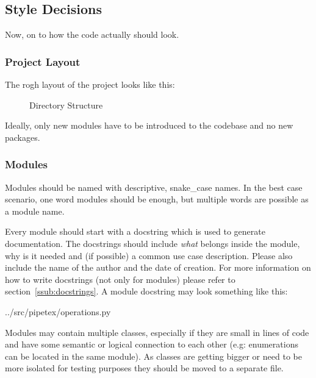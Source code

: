 \subsection{Style Decisions}\label{sub:descitions}
Now, on to how the code actually should look.

\subsubsection{Project Layout}
The rogh layout of the project looks like this: 

\begin{figure}[!ht]
    \caption{Directory Structure}
\end{figure}

Ideally, only new modules have to be introduced to the codebase and no new
packages.

\newpage

\subsubsection{Modules}
Modules should be named with descriptive, snake\_case names. In the best case
scenario, one word modules should be enough, but multiple words are possible as
a module name.

Every module should start with a docstring which is used to generate
documentation.  The docstrings should include \emph{what} belongs inside the
module, why is it needed and (if possible) a common use case description.
Please also include the name of the author and the date of creation. For more
information on how to write docstrings (not only for modules) please refer to
section~\ref{ssub:docstrings}. A module docstring may look something like this:



{../src/pipetex/operations.py}


Modules may contain multiple classes, especially if they are small in lines
of code and have some semantic or logical connection to each other (e.g:
enumerations can be located in the same module). As classes are getting bigger
or need to be more isolated for testing purposes they should be moved to a
separate file.

